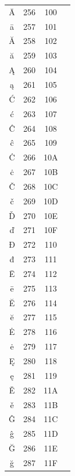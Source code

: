 ﻿\documentclass[10pt]{article}
\begin{document}
\begin{tabular}{crcl}
Ā&256&100&\\
ā&257&101&\\
Ă&258&102&\\
ă&259&103&\\
Ą&260&104&\\
ą&261&105&\\
Ć&262&106&\\
ć&263&107&\\
Ĉ&264&108&\\
ĉ&265&109&\\
Ċ&266&10A&\\
ċ&267&10B&\\
Č&268&10C&\\
č&269&10D&\\
Ď&270&10E&\\
ď&271&10F&\\
Đ&272&110&\\
đ&273&111&\\
Ē&274&112&\\
ē&275&113&\\
Ĕ&276&114&\\
ĕ&277&115&\\
Ė&278&116&\\
ė&279&117&\\
Ę&280&118&\\
ę&281&119&\\
Ě&282&11A&\\
ě&283&11B&\\
Ĝ&284&11C&\\
ĝ&285&11D&\\
Ğ&286&11E&\\
ğ&287&11F&\\
\end{tabular}
\end{document}
